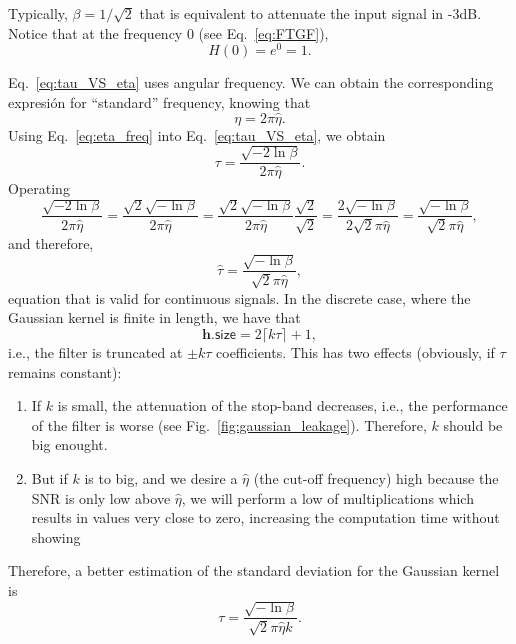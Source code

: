 \documentclass{article}
\begin{document}
Typically, $\beta=1/\sqrt{2}$ that is equivalent to attenuate the
input signal in -3dB. Notice that at the frequency 0 (see
Eq.~\ref{eq:FTGF}),
\begin{equation*}
  H(0) = e^0=1.
\end{equation*}

Eq.~\ref{eq:tau_VS_eta} uses angular frequency. We can obtain the
corresponding expresión for ``standard'' frequency, knowing that
\begin{equation}
  \eta = 2\pi\hat{\eta}.
  \label{eq:eta_freq}
\end{equation}
Using Eq.~\ref{eq:eta_freq} into Eq.~\ref{eq:tau_VS_eta}, we obtain
\begin{equation}
  \tau = \frac{\sqrt{-2\ln\beta}}{2\pi\hat{\eta}}.
  \label{eq:tau_VS_eta_standard}
\end{equation}
Operating
\begin{equation*}
  \frac{\sqrt{-2\ln\beta}}{2\pi\hat{\eta}} = \frac{\sqrt{2}\sqrt{-\ln\beta}}{2\pi\hat{\eta}} = \frac{\sqrt{2}\sqrt{-\ln\beta}}{2\pi\hat{\eta}}\frac{\sqrt{2}}{\sqrt{2}} = \frac{2\sqrt{-\ln\beta}}{2\sqrt{2}\pi\hat{\eta}} = \frac{\sqrt{-\ln\beta}}{\sqrt{2}\pi\hat{\eta}},
\end{equation*}
and therefore,
\begin{equation}
  \hat{\tau} = \frac{\sqrt{-\ln\beta}}{\sqrt{2}\pi\hat{\eta}},
  \label{eq:ideal_hat_tau}
\end{equation}
equation that is valid for continuous signals. In the discrete case,
where the Gaussian kernel is finite in length, we have that
\begin{equation}
  \mathbf{h}.\mathsf{size} = 2\lceil k\tau\rceil + 1,
  \label{eq:kernel_length}
\end{equation}
i.e., the filter is truncated at $\pm k\tau$ coefficients. This has
two effects (obviously, if $\tau$ remains constant):
\begin{enumerate}
\item If $k$ is small, the attenuation of the stop-band decreases,
  i.e., the performance of the filter is worse (see
  Fig.~\ref{fig:gaussian_leakage}). Therefore, $k$ should be big
  enought.
\item But if $k$ is to big, and we desire a $\hat{\eta}$ (the cut-off
  frequency) high because the SNR is only low above $\hat{\eta}$, we
  will perform a low of multiplications which results in values very
  close to zero, increasing the computation time without showing
\end{enumerate}
Therefore, a better estimation of the standard deviation for the
Gaussian kernel is
\begin{equation}
  \tau = \frac{\sqrt{-\ln\beta}}{\sqrt{2}\pi\hat{\eta}k}.
  \label{eq:ideal_hat_tau}
\end{equation}
\end{document}
